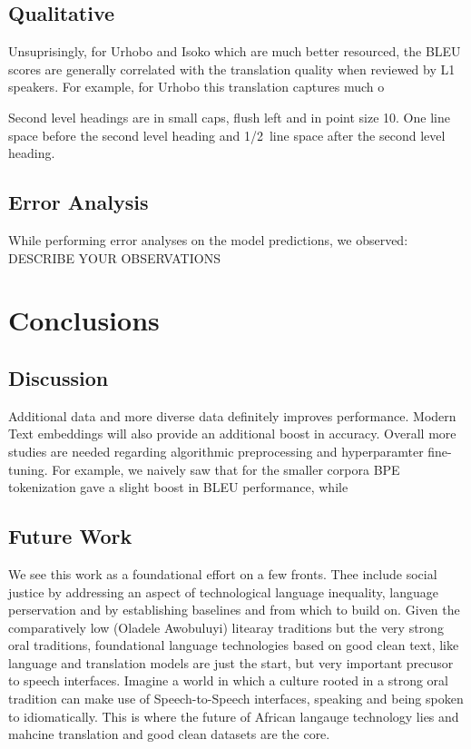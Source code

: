 \documentclass{article} %
\begin{document}
\subsection{Qualitative}

Unsuprisingly, for Urhobo and Isoko which are much better resourced, the BLEU scores are generally correlated with the translation quality when reviewed by L1 speakers. For example, for Urhobo this translation captures much o

Second level headings are in small caps,
flush left and in point size 10. One line space before the second level
heading and 1/2~line space after the second level heading.

\subsection{Error Analysis}
While performing error analyses on the model predictions, we observed: DESCRIBE YOUR OBSERVATIONS

\section{Conclusions}


\subsection{Discussion}
Additional data and more diverse data definitely improves performance. Modern Text embeddings will also provide an additional boost in accuracy. Overall more studies are needed regarding algorithmic preprocessing and hyperparamter fine-tuning. For example, we naively saw that for the smaller corpora BPE tokenization gave a slight boost in BLEU performance, while 


\subsection{Future Work}
We see this work as a foundational effort on a few fronts. Thee include social justice by addressing an aspect of technological language inequality, language perservation and by establishing baselines and from which to build on. Given the comparatively low (Oladele Awobuluyi) litearay traditions but the very strong oral traditions, foundational language technologies based on good clean text, like language and translation models are just the start, but very important precusor to speech interfaces. Imagine a world in which a culture rooted in a strong oral tradition can make use of Speech-to-Speech interfaces, speaking and being spoken to idiomatically. This is where the future of African langauge technology lies and mahcine translation and good clean datasets are the core.   
\end{document}
